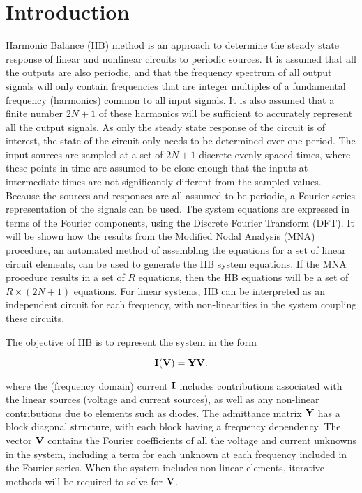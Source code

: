 \section{Introduction}

Harmonic Balance (HB) method is an approach to determine the steady state response of linear and nonlinear circuits to periodic sources.
It is assumed that all the outputs are also periodic, and that the frequency spectrum of all output signals will only contain frequencies that are integer multiples of a fundamental frequency (harmonics) common to all input signals.
It is also assumed that a finite number \( 2 N + 1 \) of these harmonics will be sufficient to accurately represent all the output signals.
As only the steady state response of the circuit is of interest, the state of the circuit only needs to be determined over one period.
The input sources are sampled at a set of \( 2 N + 1 \) discrete evenly spaced times, where these points in time are assumed to be close enough that the inputs at intermediate times are not significantly different from the sampled values.
Because the sources and responses are all assumed to be periodic, a Fourier series representation of the signals can be used.
The system equations are expressed in terms of the Fourier components, using the Discrete Fourier Transform (DFT).  It will be shown how the results from the Modified Nodal Analysis (MNA) procedure, an automated method of assembling the equations for a set of linear circuit elements, can be used to generate the HB system equations.  If the MNA procedure results in a set of \( R \) equations, then the HB equations will be a set of \( R \times (2 N + 1) \) equations.  
For linear systems, HB can be interpreted as an independent circuit for each frequency, with non-linearities in the system coupling these circuits.

The objective of HB is to represent the system in the form

\begin{equation}\label{eqn:ece1254projectReport:560}
\BI(\BV) = \BY \BV.
\end{equation}

where the (frequency domain) current \( \mathbf{I} \) includes contributions associated with the linear sources (voltage and current sources), as well as any non-linear contributions due to elements such as diodes.
The admittance matrix \( \mathbf{Y} \) has a block diagonal structure, with each block having a frequency dependency.
The vector \( \mathbf{V} \) contains the Fourier coefficients of all the voltage and current unknowns in the system, including a term for each unknown at each frequency included in the Fourier series.
When the system includes non-linear elements, iterative methods will be required to solve for \( \mathbf{V} \).

